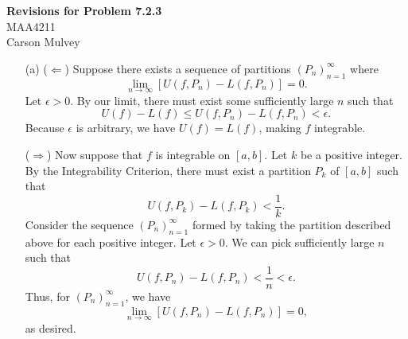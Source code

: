 \documentclass[11pt,letterpaper]{article}
\begin{document}
\begin{center}
    \begin{large}
        \textbf{Revisions for Problem 7.2.3} \\
        MAA4211 \\
        Carson Mulvey
    \end{large}
\end{center}

\begin{enumerate}
    \item[(a)] ($\Leftarrow$) Suppose there exists a sequence of partitions $(P_n)_{n=1}^\infty$ where
    \[ \lim_{n\rightarrow \infty} [ U(f,P_n) - L(f,P_n) ] = 0. \]
    Let $\epsilon >0$. By our limit, there must exist some sufficiently large $n$ such that
    \[
        U(f) - L(f) \leq U(f,P_n) - L(f,P_n) < \epsilon.
    \]
    Because $\epsilon$ is arbitrary, we have $U(f)=L(f)$, making $f$ integrable.

    ($\Rightarrow$) Now suppose that $f$ is integrable on $[a,b]$. Let $k$ be a positive integer. By the Integrability Criterion, there must exist a partition $P_k$ of $[a,b]$ such that
    \[ U(f,P_k) - L(f,P_k) < \frac{1}{k}. \]
    Consider the sequence $(P_n)_{n=1}^\infty$ formed by taking the partition described above for each positive integer. Let $\epsilon >0$. We can pick sufficiently large $n$ such that
    \[ U(f,P_n) - L(f,P_n) < \frac{1}{n} < \epsilon. \]
    Thus, for $(P_n)_{n=1}^\infty$, we have
    \[ \lim_{n\rightarrow \infty} [ U(f,P_n) - L(f,P_n) ] = 0, \]
    as desired.
    

\end{enumerate}
\end{document}
